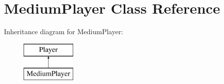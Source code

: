 \hypertarget{class_medium_player}{}\section{Medium\+Player Class Reference}
\label{class_medium_player}
Inheritance diagram for Medium\+Player\+:\begin{figure}[H]
\begin{center}
\leavevmode
\includegraphics[height=2.000000cm]{class_medium_player}
\end{center}
\end{figure}
